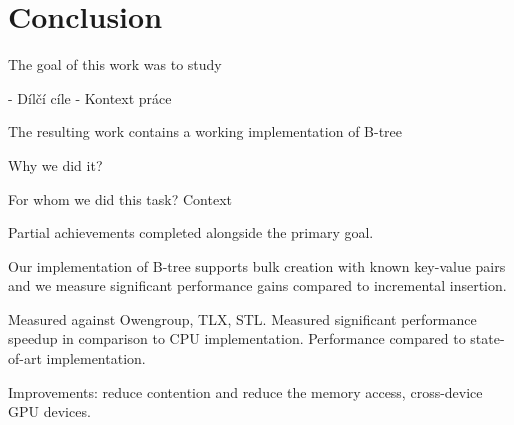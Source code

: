 \section{Conclusion}

The goal of this work was to study

- Dílčí cíle
- Kontext práce

The resulting work contains a working implementation of B-tree

Why we did it?

For whom we did this task? Context

Partial achievements completed alongside the primary goal.

Our implementation of B-tree supports bulk creation with known key-value pairs and we measure significant performance gains compared to incremental insertion.

Measured against Owengroup, TLX, STL. Measured significant performance speedup in comparison to CPU implementation. Performance compared to state-of-art implementation.

Improvements: reduce contention and reduce the memory access, cross-device GPU devices.